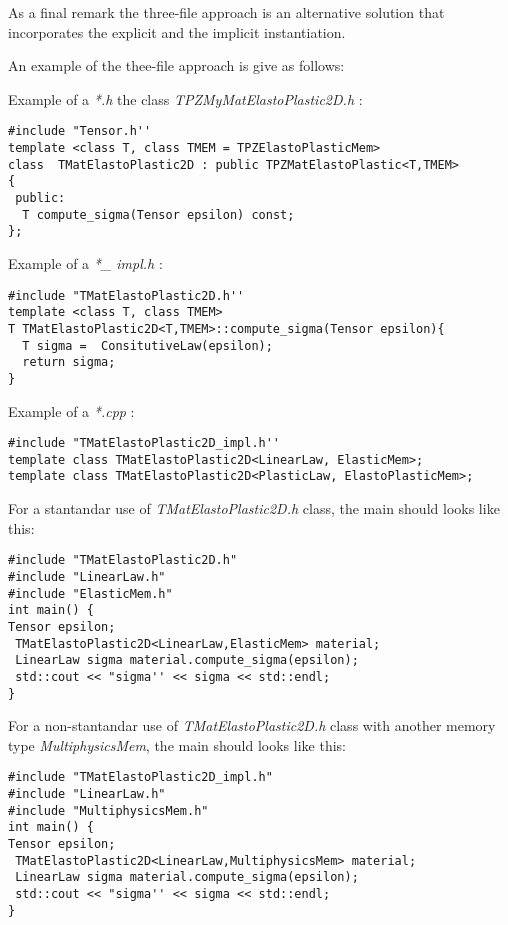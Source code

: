 \documentclass[a4paper]{article}
\begin{document}
As a final remark the three-file approach is an alternative solution that incorporates the explicit and the implicit instantiation.

An example of the thee-file approach is give as follows:

Example of a  \textit{*.h} the class  \textit{TPZMyMatElastoPlastic2D.h} :

\begin{lstlisting}
#include "Tensor.h''
template <class T, class TMEM = TPZElastoPlasticMem>
class  TMatElastoPlastic2D : public TPZMatElastoPlastic<T,TMEM>
{
 public:
  T compute_sigma(Tensor epsilon) const;
};
\end{lstlisting}

Example of a  \textit{*\_ impl.h} :

\begin{lstlisting}
#include "TMatElastoPlastic2D.h''
template <class T, class TMEM>
T TMatElastoPlastic2D<T,TMEM>::compute_sigma(Tensor epsilon){
  T sigma =  ConsitutiveLaw(epsilon);
  return sigma;
}
\end{lstlisting}

Example of a  \textit{*.cpp} :

\begin{lstlisting}
#include "TMatElastoPlastic2D_impl.h''
template class TMatElastoPlastic2D<LinearLaw, ElasticMem>;
template class TMatElastoPlastic2D<PlasticLaw, ElastoPlasticMem>;
\end{lstlisting}

For a stantandar use of \textit{TMatElastoPlastic2D.h} class, the main should 
looks like this:

\begin{lstlisting}
#include "TMatElastoPlastic2D.h"
#include "LinearLaw.h"
#include "ElasticMem.h"
int main() {
Tensor epsilon;
 TMatElastoPlastic2D<LinearLaw,ElasticMem> material;
 LinearLaw sigma material.compute_sigma(epsilon);
 std::cout << "sigma'' << sigma << std::endl;
}
\end{lstlisting}


For a non-stantandar use of \textit{TMatElastoPlastic2D.h} class with another memory type \textit{MultiphysicsMem}, the main should 
looks like this:

\begin{lstlisting}
#include "TMatElastoPlastic2D_impl.h"
#include "LinearLaw.h"
#include "MultiphysicsMem.h"
int main() {
Tensor epsilon;
 TMatElastoPlastic2D<LinearLaw,MultiphysicsMem> material;
 LinearLaw sigma material.compute_sigma(epsilon);
 std::cout << "sigma'' << sigma << std::endl;
}
\end{lstlisting}
\end{document}
